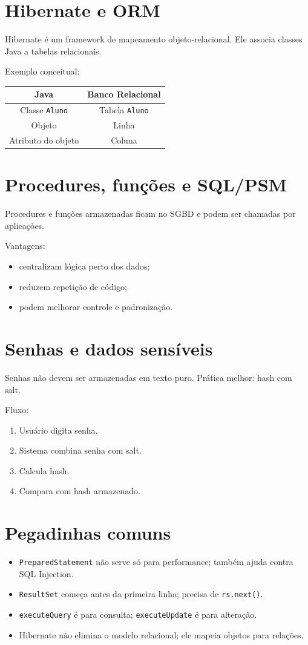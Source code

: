 \documentclass[12pt,a4paper]{article}
\begin{document}
\section{Hibernate e ORM}
Hibernate é um framework de mapeamento objeto-relacional. Ele associa classes Java a tabelas relacionais.

Exemplo conceitual:
\begin{center}
\begin{tabular}{|c|c|}
\hline
Java & Banco Relacional \\
\hline
Classe \texttt{Aluno} & Tabela \texttt{Aluno} \\
Objeto & Linha \\
Atributo do objeto & Coluna \\
\hline
\end{tabular}
\end{center}

\section{Procedures, funções e SQL/PSM}
Procedures e funções armazenadas ficam no SGBD e podem ser chamadas por aplicações.

Vantagens:
\begin{itemize}
    \item centralizam lógica perto dos dados;
    \item reduzem repetição de código;
    \item podem melhorar controle e padronização.
\end{itemize}

\section{Senhas e dados sensíveis}
Senhas não devem ser armazenadas em texto puro. Prática melhor: hash com salt.

Fluxo:
\begin{enumerate}
    \item Usuário digita senha.
    \item Sistema combina senha com salt.
    \item Calcula hash.
    \item Compara com hash armazenado.
\end{enumerate}

\section{Pegadinhas comuns}
\begin{itemize}
    \item \texttt{PreparedStatement} não serve só para performance; também ajuda contra SQL Injection.
    \item \texttt{ResultSet} começa antes da primeira linha; precisa de \texttt{rs.next()}.
    \item \texttt{executeQuery} é para consulta; \texttt{executeUpdate} é para alteração.
    \item Hibernate não elimina o modelo relacional; ele mapeia objetos para relações.
\end{itemize}
\end{document}
